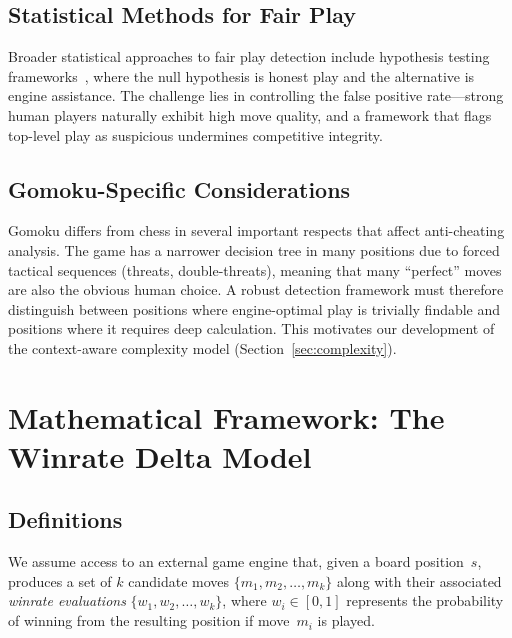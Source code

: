 \documentclass[11pt,a4paper]{article}
\begin{document}
\subsection{Statistical Methods for Fair Play}

Broader statistical approaches to fair play detection include hypothesis
testing frameworks~\citep{berger1987testing}, where the null hypothesis
is honest play and the alternative is engine assistance. The challenge
lies in controlling the false positive rate---strong human players
naturally exhibit high move quality, and a framework that flags top-level
play as suspicious undermines competitive integrity.

\subsection{Gomoku-Specific Considerations}

Gomoku differs from chess in several important respects that affect anti-cheating
analysis. The game has a narrower decision tree in many positions due to forced
tactical sequences (threats, double-threats), meaning that many ``perfect''
moves are also the obvious human choice. A robust detection framework must
therefore distinguish between positions where engine-optimal play is trivially
findable and positions where it requires deep calculation. This motivates our
development of the context-aware complexity model (Section~\ref{sec:complexity}).


\section{Mathematical Framework: The Winrate Delta Model}
\label{sec:framework}

\subsection{Definitions}

We assume access to an external game engine that, given a board position~$s$,
produces a set of $k$ candidate moves $\{m_1, m_2, \ldots, m_k\}$ along with
their associated \emph{winrate evaluations} $\{w_1, w_2, \ldots, w_k\}$, where
$w_i \in [0, 1]$ represents the probability of winning from the resulting
position if move~$m_i$ is played.
\end{document}
